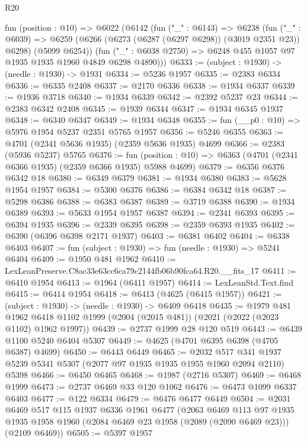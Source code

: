 \begin{lexlean}{R20}
\begin{coremodule}
  fun (position : @10) =>
  @6022
    (@6142
      (fun ("_" : @6143) =>
      @6238
        (fun ("_" : @6039) =>
        @6259 (@6266 (@6273 (@6287 (@6297 @6298)) (@3019 @2351 @23)) @6298) (@5099 @6254))
        (fun ("_" : @6038 @2750) => @6248 @455 @1057 @97 @1935 @1935 @1960 @4849 @6298 @4890)))
@6333 := (subject : @1930) -> (needle : @1930) -> @1931
@6334 := @5236 @1957
@6335 := @2383 @6334
@6336 := @6335 @2408
@6337 := @2170 @6336
@6338 := @1934 @6337
@6339 := @1936 @3718
@6340 := @1934 @6339
@6342 := @2392 @5237 @23
@6344 := @2383 @6342 @2408
@6345 := @1939 @6344
@6347 := @1934 @6345 @1937
@6348 := @6340 @6347
@6349 := @1934 @6348
@6355 := fun (__p0 : @10) => @5976 @1954 @5237 @2351 @5765 @1957
@6356 := @5246 @6355
@6363 := @4701 (@2341 @5636 @1935) (@2359 @5636 @1935) @4699
@6366 := @2383 (@5936 @5237) @5765
@6376 := fun (position : @10) => @6363 (@4701 (@2341 @6366 @1935) (@2359 @6366 @1935) @5988 @4699)
@6379 := @6356 @6376 @6342 @18
@6380 := @6349 @6379
@6381 := @1934 @6380
@6383 := @5628 @1954 @1957
@6384 := @5300 @6376
@6386 := @6384 @6342 @18
@6387 := @5298 @6386
@6388 := @6383 @6387
@6389 := @3719 @6388
@6390 := @1934 @6389
@6393 := @5633 @1954 @1957 @6387
@6394 := @2341 @6393
@6395 := @6394 @1935
@6396 := @2339 @6395
@6398 := @2359 @6393 @1935
@6402 := @6390 (@6396 @6398 @2171 @1937)
@6403 := @6381 @6402
@6404 := @6338 @6403
@6407 := fun (subject : @1930) => fun (needle : @1930) => @5241 @6404
@6409 := @1950 @481 @1962
@6410 := LexLeanPreserve.C8ac33e63cc6ca79c2144fb06b90fca64.R20.__fits_17
@6411 := @6410 @1954
@6413 := @1964 (@6411 @1957)
@6414 := LexLeanStd.Text.find
@6415 := @6414 @1954
@6418 := @6413 (@4625 (@6415 @1957))
@6421 := (subject : @1930) -> (needle : @1930) -> @6409 @6418
@6435 := @1979
    @481
    @1962
    @6418
    @1102
    @1999
    (@2004 (@2015 @481))
    (@2021 (@2022 (@2023 @1102) @1962 @1997))
@6439 := @2737 @1999 @28 @120 @519
@6443 := @6439 @1100 @5240 @6404 @5307
@6449 := @4625 (@4701 @6395 @6398 (@4705 @6387) @4699)
@6450 := @6443 @6449
@6465 := @2032
    @517
    @341
    @1937
    @5239
    @5341
    @5307
    (@2077 @97 @1935 @1935 @1955 @1960 @2094 @2110)
    @5398
@6466 := @6450 @6465
@6468 := @1987 (@2716 @5307)
@6469 := @6468 @1999
@6473 := @2737 @6469 @33 @120 @1062
@6476 := @6473 @1099 @6337 @6403
@6477 := @122 @6334
@6479 := @6476 @6477 @6449
@6504 := @2031
    @6469
    @517
    @115
    @1937
    @6336
    @1961
    @6477
    (@2063
      @6469
      @113
      @97
      @1935
      @1935
      @1958
      @1960
      (@2084 @6469 @23 @1958 (@2089 (@2090 @6469 @23)))
      (@2109 @6469))
@6505 := @5397 @1957

\end{coremodule}
\end{lexlean}
